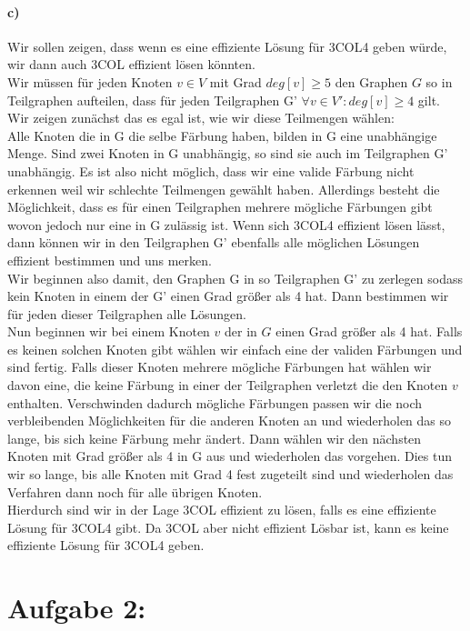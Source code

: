 \documentclass[a4paper]{article}
\begin{document}
\paragraph*{c)}
Wir sollen zeigen, dass wenn es eine effiziente Lösung für 3COL4 geben würde,
wir dann auch 3COL effizient lösen könnten. \\
Wir müssen für jeden Knoten $v \in V$ mit Grad $deg[v] \geq 5$ den Graphen $G$ so 
in Teilgraphen aufteilen, dass für jeden Teilgraphen G' $\forall v \in V': deg[v] \geq 4$
gilt. Wir zeigen zunächst das es egal ist, wie wir diese Teilmengen wählen: \\
Alle Knoten die in G die selbe Färbung haben, bilden in G eine unabhängige Menge. Sind
zwei Knoten in G unabhängig, so sind sie auch im Teilgraphen G' unabhängig. Es ist also
nicht möglich, dass wir eine valide Färbung nicht erkennen weil wir schlechte Teilmengen
gewählt haben. Allerdings besteht die Möglichkeit, dass es für einen Teilgraphen mehrere
mögliche Färbungen gibt wovon jedoch nur eine in G zulässig ist. Wenn sich 3COL4 effizient
lösen lässt, dann können wir in den Teilgraphen G' ebenfalls alle möglichen Lösungen
effizient bestimmen und uns merken. \\
Wir beginnen also damit, den Graphen G in so Teilgraphen G' zu zerlegen sodass kein Knoten
in einem der G' einen Grad größer als 4 hat. Dann bestimmen wir für jeden dieser Teilgraphen
alle Lösungen. \\
Nun beginnen wir bei einem Knoten $v$ der in $G$ einen Grad größer als 4 hat. Falls es 
keinen solchen Knoten gibt wählen wir einfach eine der validen Färbungen und sind fertig.
Falls dieser Knoten mehrere mögliche Färbungen hat wählen wir davon eine, die keine
Färbung in einer der Teilgraphen verletzt die den Knoten $v$ enthalten. Verschwinden
dadurch mögliche Färbungen passen wir die noch verbleibenden Möglichkeiten für die
anderen Knoten an und wiederholen das so lange, bis sich keine Färbung mehr ändert.
Dann wählen wir den nächsten Knoten mit Grad größer als 4 in G aus und wiederholen
das vorgehen. Dies tun wir so lange, bis alle Knoten mit Grad 4 fest zugeteilt sind
und wiederholen das Verfahren dann noch für alle übrigen Knoten. \\
Hierdurch sind wir in der Lage 3COL effizient zu lösen, falls es eine effiziente
Lösung für 3COL4 gibt. Da 3COL aber nicht effizient Lösbar ist, kann es keine
effiziente Lösung für 3COL4 geben.
\section*{Aufgabe 2:}
\end{document}
